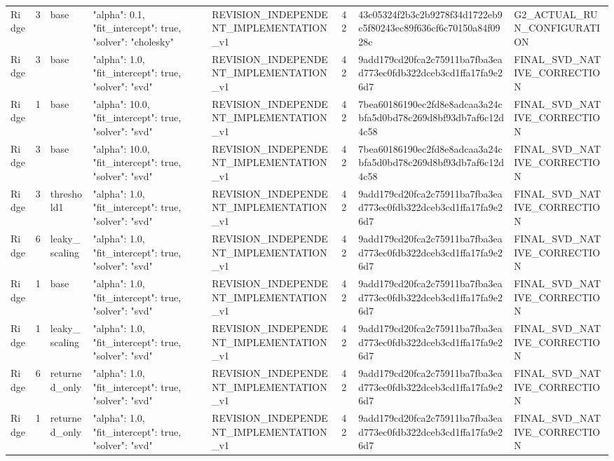 \begin{longtable}{llllllll}
Ridge & 3 & base & {"alpha": 0.1, "fit\_intercept": true, "solver": "cholesky"} & REVISION\_INDEPENDENT\_IMPLEMENTATION\_v1 & 42 & 43c05324f2b3c2b9278f34d1722eb9c5f80243ec89f636cf6c70150a84f0928c & G2\_ACTUAL\_RUN\_CONFIGURATION \\
Ridge & 3 & base & {"alpha": 1.0, "fit\_intercept": true, "solver": "svd"} & REVISION\_INDEPENDENT\_IMPLEMENTATION\_v1 & 42 & 9add179cd20fca2c75911ba7fba3ead773ec0fdb322dceb3cd1ffa17fa9e26d7 & FINAL\_SVD\_NATIVE\_CORRECTION \\
Ridge & 1 & base & {"alpha": 10.0, "fit\_intercept": true, "solver": "svd"} & REVISION\_INDEPENDENT\_IMPLEMENTATION\_v1 & 42 & 7bea60186190ec2fd8e8adcaa3a24cbfa5d0bd78c269d8bf93db7af6c12d4c58 & FINAL\_SVD\_NATIVE\_CORRECTION \\
Ridge & 3 & base & {"alpha": 10.0, "fit\_intercept": true, "solver": "svd"} & REVISION\_INDEPENDENT\_IMPLEMENTATION\_v1 & 42 & 7bea60186190ec2fd8e8adcaa3a24cbfa5d0bd78c269d8bf93db7af6c12d4c58 & FINAL\_SVD\_NATIVE\_CORRECTION \\
Ridge & 3 & threshold1 & {"alpha": 1.0, "fit\_intercept": true, "solver": "svd"} & REVISION\_INDEPENDENT\_IMPLEMENTATION\_v1 & 42 & 9add179cd20fca2c75911ba7fba3ead773ec0fdb322dceb3cd1ffa17fa9e26d7 & FINAL\_SVD\_NATIVE\_CORRECTION \\
Ridge & 6 & leaky\_scaling & {"alpha": 1.0, "fit\_intercept": true, "solver": "svd"} & REVISION\_INDEPENDENT\_IMPLEMENTATION\_v1 & 42 & 9add179cd20fca2c75911ba7fba3ead773ec0fdb322dceb3cd1ffa17fa9e26d7 & FINAL\_SVD\_NATIVE\_CORRECTION \\
Ridge & 1 & base & {"alpha": 1.0, "fit\_intercept": true, "solver": "svd"} & REVISION\_INDEPENDENT\_IMPLEMENTATION\_v1 & 42 & 9add179cd20fca2c75911ba7fba3ead773ec0fdb322dceb3cd1ffa17fa9e26d7 & FINAL\_SVD\_NATIVE\_CORRECTION \\
Ridge & 1 & leaky\_scaling & {"alpha": 1.0, "fit\_intercept": true, "solver": "svd"} & REVISION\_INDEPENDENT\_IMPLEMENTATION\_v1 & 42 & 9add179cd20fca2c75911ba7fba3ead773ec0fdb322dceb3cd1ffa17fa9e26d7 & FINAL\_SVD\_NATIVE\_CORRECTION \\
Ridge & 6 & returned\_only & {"alpha": 1.0, "fit\_intercept": true, "solver": "svd"} & REVISION\_INDEPENDENT\_IMPLEMENTATION\_v1 & 42 & 9add179cd20fca2c75911ba7fba3ead773ec0fdb322dceb3cd1ffa17fa9e26d7 & FINAL\_SVD\_NATIVE\_CORRECTION \\
Ridge & 1 & returned\_only & {"alpha": 1.0, "fit\_intercept": true, "solver": "svd"} & REVISION\_INDEPENDENT\_IMPLEMENTATION\_v1 & 42 & 9add179cd20fca2c75911ba7fba3ead773ec0fdb322dceb3cd1ffa17fa9e26d7 & FINAL\_SVD\_NATIVE\_CORRECTION \\

\end{longtable}
